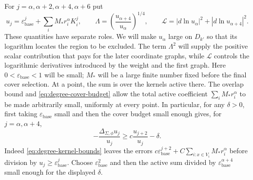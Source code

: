 For $j=\alpha,\alpha+2,\alpha+4,\alpha+6$ put
\begin{equation}\label{eq:degree-potentials}
 u_j=\varepsilon_{\mathrm{base}}^j+\sum_i M_*r_i^\alpha K_i^j,
 \qquad \Lambda=\left(\frac{u_{\alpha+4}}{u_\alpha}\right)^{1/4},
 \qquad
 \mathcal L=|d\ln u_\alpha|^2+|d\ln u_{\alpha+4}|^2.
\end{equation}
These quantities have separate roles.  We will make $u_\alpha$ large on
$D_{k'}$ so that its logarithm locates the region to be excluded.
The term $\Lambda^2$ will supply the positive scalar contribution that
pays for the later coordinate graphs, while $\mathcal L$ controls the
logarithmic derivatives introduced by the weight and the first graph.
Here $0<\varepsilon_{\mathrm{base}}<1$ will be small; $M_*$ will be a
large finite number fixed before the final cover selection.  At a point, the sum is over the
kernels active there.  The overlap bound and
\eqref{eq:degree-cover-budget} allow the total active coefficient
$\sum_i M_*r_i^\alpha$ to be made arbitrarily small, uniformly at every
point.  In particular, for any $\delta>0$, first taking
$\varepsilon_{\mathrm{base}}$ small and then the cover budget small enough
gives, for $j=\alpha,\alpha+4$,
\begin{equation}\label{eq:degree-potential-laplacian}
       -\frac{\Delta_{\Sigma,\phi}u_j}{u_j}
                    \ge c\frac{u_{j+2}}{u_j}-\delta.
\end{equation}
Indeed \eqref{eq:degree-kernel-bounds} leaves the errors
$c\varepsilon_{\mathrm{base}}^{j+2}+C\sum_{i:x\in V_i}M_*r_i^\alpha$
before division by $u_j\ge\varepsilon_{\mathrm{base}}^j$.  Choose
$\varepsilon_{\mathrm{base}}^2$ and then the active sum divided by
$\varepsilon_{\mathrm{base}}^{\alpha+4}$ small enough for the displayed
$\delta$.

